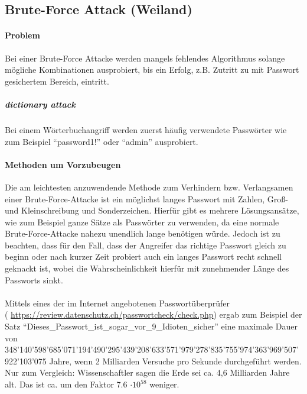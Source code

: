 \subsection{Brute-Force Attack (Weiland)}
\paragraph{Problem}
Bei einer Brute-Force Attacke werden mangels fehlendes Algorithmus solange mögliche Kombinationen ausprobiert, bis ein Erfolg, z.B. Zutritt zu mit Passwort gesichertem Bereich, eintritt.
\subparagraph{dictionary attack}
Bei einem Wörterbuchangriff werden zuerst häufig verwendete Passwörter wie zum Beispiel \enquote{password1!} oder \enquote{admin} ausprobiert. 
\paragraph{Methoden um Vorzubeugen}
Die am leichtesten anzuwendende Methode zum Verhindern bzw. Verlangsamen einer Brute-Force-Attacke ist ein möglichst langes Passwort mit Zahlen, Groß- und Kleinschreibung und Sonderzeichen. Hierfür gibt es mehrere Lösungsansätze, wie zum Beispiel ganze Sätze als Passwörter zu verwenden, da eine normale Brute-Force-Attacke nahezu unendlich lange benötigen würde. Jedoch ist zu beachten, dass für den Fall, dass der Angreifer das richtige Passwort gleich zu beginn oder nach kurzer Zeit probiert auch ein langes Passwort recht schnell geknackt ist, wobei die Wahrscheinlichkeit hierfür mit zunehmender Länge des Passworts sinkt.\\
\\
Mittels eines der im Internet angebotenen Passwortüberprüfer \\( \href{https://review.datenschutz.ch/passwortcheck/check.php}{https://review.datenschutz.ch/passwortcheck/check.php}) ergab zum Beispiel der Satz \enquote{Dieses\_Passwort\_ist\_sogar\_vor\_9\_Idioten\_sicher\!} eine maximale Dauer von\\ 348'140'598'685'071'194'490'295'439'208'633'571'979'278'835'755'974'363'969'507'922'103'075 Jahre, wenn 2 Milliarden Versuche pro Sekunde durchgeführt werden. Nur zum Vergleich: Wissenschaftler sagen die Erde sei ca. 4,6 Milliarden Jahre alt. Das ist ca. um den Faktor 7.6 $\cdot 10^{58}$ weniger.
